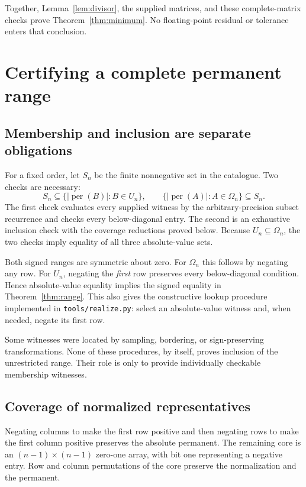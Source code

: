 \documentclass[11pt,a4paper]{article}
\theoremstyle{remark}\newtheorem{remark}[theorem]{Remark}
\DeclareMathOperator{\per}{per}
\newcommand{\Om}{\Omega}
\begin{document}
Together, Lemma~\ref{lem:divisor}, the supplied matrices, and these complete-matrix checks prove Theorem~\ref{thm:minimum}. No floating-point residual or tolerance enters that conclusion.

\section{Certifying a complete permanent range}
\subsection{Membership and inclusion are separate obligations}
For a fixed order, let $S_n$ be the finite nonnegative set in the catalogue. Two checks are necessary:
\[
 S_n\subseteq\{|\per(B)|:B\in U_n\},\qquad
 \{|\per(A)|:A\in\Om_n\}\subseteq S_n.
\]
The first check evaluates every supplied witness by the arbitrary-precision subset recurrence and checks every below-diagonal entry. The second is an exhaustive inclusion check with the coverage reductions proved below. Because $U_n\subseteq\Om_n$, the two checks imply equality of all three absolute-value sets.

Both signed ranges are symmetric about zero. For $\Om_n$ this follows by negating any row. For $U_n$, negating the \emph{first} row preserves every below-diagonal condition. Hence absolute-value equality implies the signed equality in Theorem~\ref{thm:range}. This also gives the constructive lookup procedure implemented in \texttt{tools/realize.py}: select an absolute-value witness and, when needed, negate its first row.

Some witnesses were located by sampling, bordering, or sign-preserving transformations. None of these procedures, by itself, proves inclusion of the unrestricted range. Their role is only to provide individually checkable membership witnesses.

\subsection{Coverage of normalized representatives}
Negating columns to make the first row positive and then negating rows to make the first column positive preserves the absolute permanent. The remaining core is an $(n-1)\times(n-1)$ zero-one array, with bit one representing a negative entry. Row and column permutations of the core preserve the normalization and the permanent.
\end{document}
